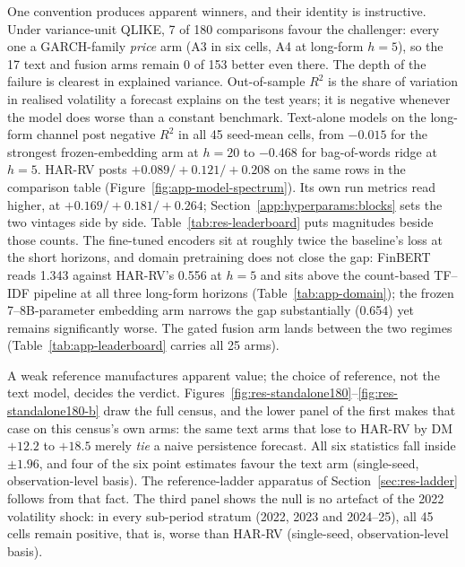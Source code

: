 One convention produces apparent winners, and their identity is instructive. Under variance-unit QLIKE, 7 of 180 comparisons favour the challenger: every one a GARCH-family \emph{price} arm (A3 in six cells, A4 at long-form $h=5$), so the 17 text and fusion arms remain 0 of 153 better even there. %
The depth of the failure is clearest in explained variance. Out-of-sample $R^2$ is the share of variation in realised volatility a forecast explains on the test years; it is negative whenever the model does worse than a constant benchmark. Text-alone models on the long-form channel post negative $R^2$ in all 45 seed-mean cells, from $-0.015$ for the strongest frozen-embedding arm at $h=20$ to $-0.468$ for bag-of-words ridge at $h=5$. HAR-RV posts $+0.089/+0.121/+0.208$ on the same rows in the comparison table (Figure~\ref{fig:app-model-spectrum}). Its own run metrics read higher, at $+0.169/+0.181/+0.264$; Section~\ref{app:hyperparams:blocks} sets the two vintages side by side. %
Table~\ref{tab:res-leaderboard} puts magnitudes beside those counts. The fine-tuned encoders sit at roughly twice the baseline's loss at the short horizons, and domain pretraining does not close the gap: FinBERT reads 1.343 against HAR-RV's 0.556 at $h=5$ and sits above the count-based TF--IDF pipeline at all three long-form horizons (Table~\ref{tab:app-domain}); the frozen 7--8B-parameter embedding arm narrows the gap substantially (0.654) yet remains significantly worse. The gated fusion arm lands between the two regimes (Table~\ref{tab:app-leaderboard} carries all 25 arms). %

A weak reference manufactures apparent value; the choice of reference, not the text model, decides the verdict. Figures~\ref{fig:res-standalone180}--\ref{fig:res-standalone180-b} draw the full census, and the lower panel of the first makes that case on this census's own arms: the same text arms that lose to HAR-RV by DM $+12.2$ to $+18.5$ merely \emph{tie} a naive persistence forecast. All six statistics fall inside $\pm1.96$, and four of the six point estimates favour the text arm (single-seed, observation-level basis). The reference-ladder apparatus of Section~\ref{sec:res-ladder} follows from that fact. %
The third panel shows the null is no artefact of the 2022 volatility shock: in every sub-period stratum (2022, 2023 and 2024--25), all 45 cells remain positive, that is, worse than HAR-RV (single-seed, observation-level basis). %

